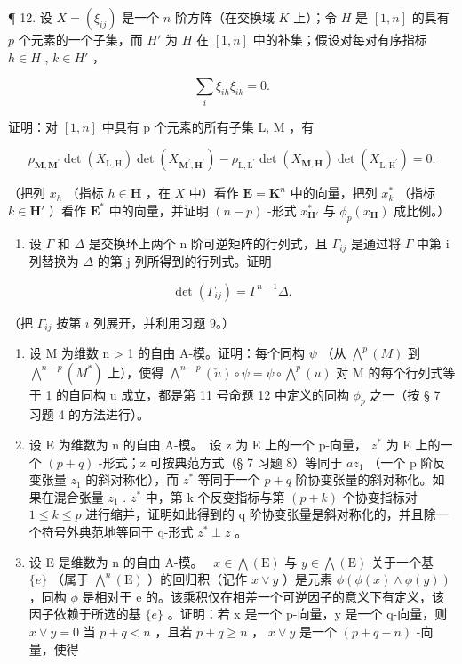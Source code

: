 ¶ 12. 设 \(X = (\xi_{ij})\) 是一个 \(n\) 阶方阵（在交换域 \(K\) 上）；令 \(H\) 是 \([1, n]\) 的具有 \(p\) 个元素的一个子集，而 \(H'\) 为 \(H\) 在 \([1, n]\) 中的补集；假设对每对有序指标 \(h \in H\) , \(k \in H'\) ，

\[
\sum_ {i} \xi_ {i h} \xi_ {i k} = 0.
\]

证明：对 \([1, n]\) 中具有 p 个元素的所有子集 L, M ，有

\[
\rho_ {\mathbf {M}, \mathbf {M} ^ {\prime}} \det (X _ {\mathrm{L}, \mathrm{H}}) \det (X _ {\mathbf {M} ^ {\prime}, \mathbf {H} ^ {\prime}}) - \rho_ {\mathrm{L}, \mathrm{L} ^ {\prime}} \det (X _ {\mathbf {M}, \mathbf {H}}) \det (X _ {\mathrm{L}, \mathrm{H} ^ {\prime}}) = 0.
\]

（把列 \(x_h\) （指标 \(h \in \mathbf{H}\) ，在 \(X\) 中）看作 \(\mathbf{E} = \mathbf{K}^n\) 中的向量，把列 \(x_k^*\) （指标 \(k \in \mathbf{H}'\) ）看作 \(\mathbf{E}^*\) 中的向量，并证明 \((n - p)\) -形式 \(x_{\mathbf{H}'}^*\) 与 \(\phi_p(x_{\mathbf{H}})\) 成比例。）

\begin{enumerate}
\def\labelenumi{\arabic{enumi}.}
\setcounter{enumi}{12}
\tightlist
\item
  设 \(\Gamma\) 和 \(\Delta\) 是交换环上两个 n 阶可逆矩阵的行列式，且 \(\Gamma_{ij}\) 是通过将 \(\Gamma\) 中第 i 列替换为 \(\Delta\) 的第 j 列所得到的行列式。证明
\end{enumerate}

\[
\det (\Gamma_ {i j}) = \Gamma^ {n - 1} \Delta .
\]

（把 \(\Gamma_{ij}\) 按第 \(i\) 列展开，并利用习题 9。）

\begin{enumerate}
\def\labelenumi{\arabic{enumi}.}
\setcounter{enumi}{13}
\item
  设 M 为维数 n \textgreater{} 1 的自由 A-模。证明：每个同构 \(\psi\) （从 \(\bigwedge^{p}(M)\) 到 \(\bigwedge^{n-p}(M^{*})\) 上），使得 \(\bigwedge^{n-p}(\check{u}) \circ \psi = \psi \circ \bigwedge^{p}(u)\) 对 M 的每个行列式等于 1 的自同构 u 成立，都是第 11 号命题 12 中定义的同构 \(\phi_{p}\) 之一（按 § 7 习题 4 的方法进行）。
\item
  设 E 为维数为 n 的自由 A-模。~设 z 为 E 上的一个 p-向量， \(z^{*}\) 为 E 上的一个 \((p + q)\) -形式；z 可按典范方式（§ 7 习题 8）等同于 \(az_{1}\) （一个 p 阶反变张量 \(z_{1}\) 的斜对称化），而 \(z^{*}\) 等同于一个 \(p + q\) 阶协变张量的斜对称化。如果在混合张量 \(z_{1}\) . \(z^{*}\) 中，第 k 个反变指标与第 \((p + k)\) 个协变指标对 \(1 \leqslant k \leqslant p\) 进行缩并，证明如此得到的 q 阶协变张量是斜对称化的，并且除一个符号外典范地等同于 q-形式 \(z^{*} \perp z\) 。
\item
  设 E 是维数为 n 的自由 A-模。~ \(x \in \bigwedge(\mathrm{E})\) 与 \(y \in \bigwedge(\mathrm{E})\) 关于一个基 \(\{e\}\) （属于 \(\bigwedge^{n}(\mathrm{E})\) ）的回归积（记作 \(x \vee y\) ）是元素 \(\phi(\phi(x) \wedge \phi(y))\) ，同构 \(\phi\) 是相对于 e 的。该乘积仅在相差一个可逆因子的意义下有定义，该因子依赖于所选的基 \(\{e\}\) 。证明：若 x 是一个 p-向量，y 是一个 q-向量，则 \(x \vee y = 0\) 当 \(p + q < n\) ，且若 \(p + q \geqslant n\) ， \(x \vee y\) 是一个 \((p + q - n)\) -向量，使得
\end{enumerate}

